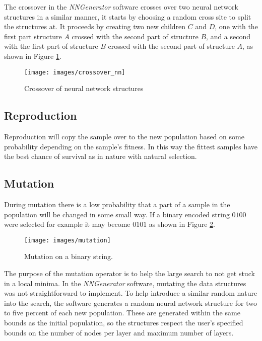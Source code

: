 The crossover in the {\it NNGenerator} software crosses over two
neural network structures in a similar manner, it starts by choosing a
random cross site to split the structures at.
It proceeds by creating two new children $C$ and $D$, one with the first part
structure $A$ crossed with the second part of structure $B$, and a
second with the first part of structure $B$ crossed with the second
part of structure $A$, as shown in Figure \ref{crossover_nn}.

\begin{figure}[htb!]
  \centering
  \texttt{[image: images/crossover\_nn]}
  \caption{Crossover of neural network structures}
  \label{crossover_nn}
\end{figure}

\subsection{Reproduction}
Reproduction will copy the sample over to the new population based on some probability depending on the sample's fitness. 
In this way the fittest samples have the best chance of survival as in nature with natural selection.

\subsection{Mutation}
During mutation there is a low probability that a part of a sample in the population will be changed in some small way. 
If a binary encoded string $0100$ were selected for example it may become $0101$ as shown in Figure \ref{mutation}.

\begin{figure}[htb!]
  \centering
  \texttt{[image: images/mutation]}
  \caption{Mutation on a binary string.}
  \label{mutation}
\end{figure}

The purpose of the mutation operator is to help the large search to not get stuck
in a local minima.
In the {\it NNGenerator} software, mutating the data structures was not
straightforward to implement. 
To help introduce a similar random nature into the search, the software generates a random neural network structure for two to five percent of each new
population.
These are generated within the same bounds as the initial population,
so the structures respect the user's specified bounds on the number of
nodes per layer and maximum number of layers.

